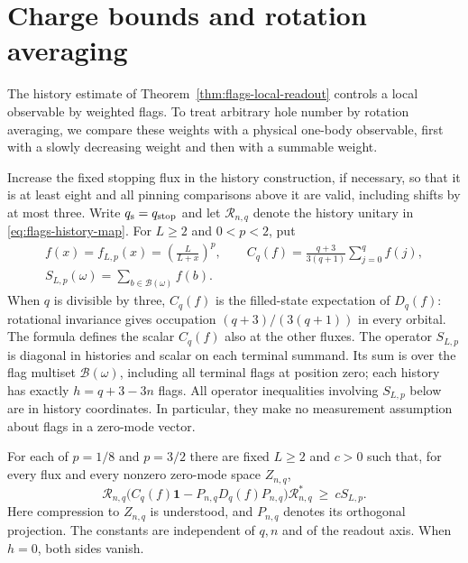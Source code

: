 \section{Charge bounds and rotation averaging}
\label{sec:charge}

The history estimate of Theorem~\ref{thm:flags-local-readout} controls a
local observable by weighted flags.  To treat arbitrary hole number by
rotation averaging, we compare these weights with a physical one-body
observable, first with a slowly decreasing weight and then with a
summable weight.

Increase the fixed stopping flux in the history construction, if
necessary, so that it is at least eight and all pinning comparisons
above it are valid, including shifts by at most three.  Write
$q_{\rm s}=q_{\mathrm{stop}}$ and let $\mathcal R_{n,q}$ denote
the history unitary in \eqref{eq:flags-history-map}.  For $L\ge2$ and
$0<p<2$, put
\begin{equation}\label{eq:charge-definitions}
 \begin{gathered}
 f(x)=f_{L,p}(x)=\left(\frac{L}{L+x}\right)^p,\qquad
 C_q(f)=\frac{q+3}{3(q+1)}\sum_{j=0}^q f(j),\\
 S_{L,p}(\omega)=\sum_{b\in\mathcal B(\omega)}f(b).
 \end{gathered}
\end{equation}
When $q$ is divisible by three, $C_q(f)$ is the filled-state expectation
of $D_q(f)$: rotational invariance gives occupation
$(q+3)/(3(q+1))$ in every orbital.  The formula defines the scalar
$C_q(f)$ also at the other fluxes.  The operator $S_{L,p}$ is diagonal
in histories and scalar on each terminal summand.  Its sum is over the
flag multiset $\mathcal B(\omega)$, including all terminal flags at
position zero; each history has exactly $h=q+3-3n$ flags.  All operator
inequalities involving $S_{L,p}$ below are in history coordinates.  In particular, they make no measurement
assumption about flags in a zero-mode vector.

\begin{proposition}\label{prop:charge-pooled}
For each of $p=1/8$ and $p=3/2$ there are fixed $L\ge2$ and $c>0$ such
that, for every flux and every nonzero zero-mode space $Z_{n,q}$,
\begin{equation}\label{eq:charge-pooled}
 \mathcal R_{n,q}\bigl(C_q(f)\mathbf1-P_{n,q}D_q(f)P_{n,q}\bigr)\mathcal R_{n,q}^*
 \ \ge\ c S_{L,p}.
\end{equation}
Here compression to $Z_{n,q}$ is understood, and $P_{n,q}$ denotes its
orthogonal projection.  The constants are independent of $q,n$ and of
the readout axis.  When $h=0$, both sides vanish.
\end{proposition}


